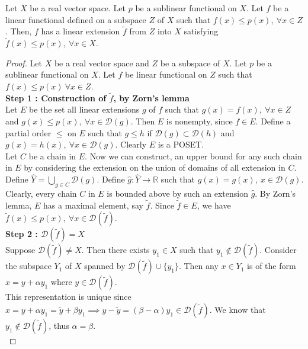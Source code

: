 \begin{theorem}
	Let $X$ be a real vector space.
	Let $p$ be a sublinear functional on $X$.
	Let $f$ be a linear functional defined on a subspace $Z$ of $X$ such that $f(x) \le p(x),\ \forall x \in Z$.
	Then, $f$ has a linear extension $\tilde{f}$ from $Z$ into $X$ satisfying $\tilde{f}(x) \le p(x),\ \forall x \in X$.
\end{theorem}
\begin{proof}
	Let $X$ be a real vector space and $Z$ be a subspace of $X$.
	Let $p$ be a sublinear functional on $X$.
	Let $f$ be linear functional on $Z$ such that $f(x) \le p(x)\ \forall x \in Z$.\\

	\textbf{Step 1 : Construction of $\tilde{f}$, by Zorn's lemma}\\
	Let $E$ be the set all linear extensions $g$ of $f$ such that $g(x) = f(x),\ \forall x \in Z$ and $g(x) \le p(x),\ \forall x \in \mathscr{D}(g)$.
	Then $E$ is nonempty, since $f \in E$.
	Define a partial order $\le$ on $E$ such that $g \le h$ if $\mathscr{D}(g) \subset \mathscr{D}(h)$ and $g(x) = h(x),\ \forall x \in \mathscr{D}(g)$.
	Clearly $E$ is a POSET.\\

	Let $C$ be a chain in $E$.
	Now we can construct, an upper bound for any such chain in $E$ by considering the extension on the union of domains of all extension in $C$.
	Define $\displaystyle \hat{Y} = \bigcup_{g \in C} \mathscr{D}(g)$.
	Define $\hat{g} : \hat{Y} \to \mathbb{R}$ such that $\hat{g}(x) = g(x),\ x \in \mathscr{D}(g)$.
	Clearly, every chain $C$ in $E$ is bounded above by such an extension $\hat{g}$.
	By Zorn's lemma, $E$ has a maximal element, say $\tilde{f}$.
	Since $\tilde{f} \in E$, we have $\tilde{f}(x) \le p(x),\ \forall x \in \mathscr{D}(\tilde{f})$.\\

	\textbf{Step 2 : $\mathscr{D}(\tilde{f}) = X$}\\
	Suppose $\mathscr{D}(\tilde{f}) \ne X$.
	Then there exists $y_1 \in X$ such that $y_1 \notin \mathscr{D}(\tilde{f})$.
	Consider the subspace $Y_1$ of $X$ spanned by $\mathscr{D}(\tilde{f}) \cup \{ y_1 \}$.
	Then any $x \in Y_1$ is of the form $x = y + \alpha y_1$ where $y \in \mathscr{D}(\tilde{f})$.\\

	This representation is unique since $x = y + \alpha y_1 = \tilde{y} + \beta y_1 \implies y-\tilde{y} = (\beta-\alpha)y_1 \in \mathscr{D}(\tilde{f})$.
	We know that $y_1 \notin \mathscr{D}(\tilde{f})$, thus $\alpha = \beta$.\\


\end{proof}
